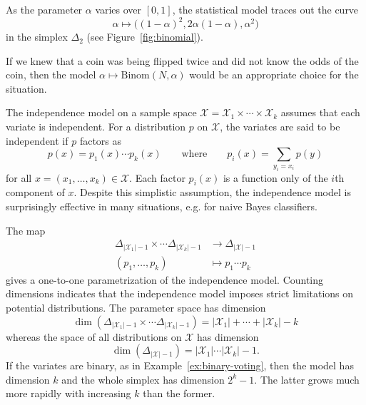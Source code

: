 \documentclass[cclicense]{hmcthesis}
\providecommand*{\xs}{\mathcal X}
\numberwithin{equation}{chapter}
\numberwithin{thmcounter}{chapter}
\begin{document}
\begin{example}
        \noindent As the parameter $\alpha$ varies over $[0,1]$, the statistical
        model traces out the curve 
        \[
            \alpha \longmapsto \big((1-\alpha)^2, 2\alpha(1-\alpha), \alpha^2\big)
        \]
        in the simplex $\Delta_2$ (see Figure~\ref{fig:binomial}).  

        If we knew that a coin was being flipped twice and did not know the
        odds of the coin, then the model $\alpha \mapsto \mathrm{Binom}(N,
        \alpha)$ would be an appropriate choice for the situation.
    \end{example}

    \begin{example}
        The independence model on a sample space $\xs = \xs_1 \times \cdots
        \times \xs_k$ assumes that each variate is independent.  For a
        distribution $p$ on $\xs$, the variates are said to be independent if
        $p$ factors as
        \[
            p(x) = p_1(x) \cdots p_k(x)
            \qquad
            \text{where}
            \qquad
            p_i(x) = \sum_{y_i = x_i} p(y) %
        \]
        for all $x = (x_1, \ldots, x_k) \in \xs$.  Each factor $p_i(x)$ is a
        function only of the $i$th component of $x$.  Despite this simplistic
        assumption, the independence model is surprisingly effective in many
        situations, e.g. for naive Bayes classifiers.  
        
        The map 
        \begin{align*}
        \Delta_{|\xs_1|-1} \times \cdots \Delta_{|\xs_k|-1} 
        &\to \Delta_{|\xs| - 1} \\
        (p_1, \ldots, p_k) &\mapsto p_1 \cdots p_k
        \end{align*}
        gives a one-to-one parametrization of the independence model.  Counting
        dimensions indicates that the independence model imposes strict
        limitations on potential distributions.  The parameter space has
        dimension
        \[
            \dim 
            (\Delta_{|\xs_1|-1} \times \cdots \Delta_{|\xs_k|-1})
            =
            |\xs_1| + \cdots + |\xs_k| - k
        \]
        whereas the space of all distributions on $\xs$ has dimension 
        \[
            \dim(\Delta_{|\xs| - 1})
            =
            |\xs_1| \cdots |\xs_k| - 1.
        \]
        If the variates are binary, as in Example~\ref{ex:binary-voting}, then the
        model has dimension $k$ and the whole simplex has dimension $2^k - 1$.
        The latter grows much more rapidly with increasing $k$ than the former.
        \label{ex:independence1}
    \end{example}
    
\end{document}
